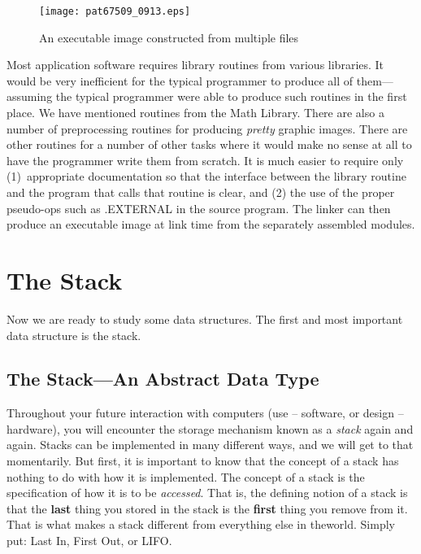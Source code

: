 \documentclass{patt}
\begin{document}
\begin{figure}[h!]
\begin{minipage}{36pc}
\centerline{\texttt{[image: pat67509\_0913.eps]}}
\caption{An executable image constructed from multiple files}
\label{fig:exec_image}
\end{minipage}
\end{figure}

Most application software requires library routines from various
libraries.  It would be very inefficient for the typical programmer to
produce all of them---assuming the typical programmer were able to produce
such routines in the first place.  We have mentioned routines from the
Math Library.  There are also a number of preprocessing routines for
producing {\em pretty} graphic images.  There are other routines for a
number of other tasks where it would make no sense at all to have the
programmer write them from scratch.  It is much easier to require only
(1)~appropriate documentation so that the interface between the
library routine and the program that calls that routine is clear, and
(2) the use of the proper pseudo-ops such as .EXTERNAL in the source
program.  The linker can then produce an executable image at link time
from the separately assembled modules.

\FloatBarrier
\section{The Stack}

Now we are ready to study some data structures.  The first and most 
important data structure is the stack.

\subsection{The Stack---An Abstract Data Type}

Throughout your future interaction with computers (use -- software, or 
design -- hardware), you will encounter 
the storage mechanism known as a {\em stack} again and again.  Stacks can be
implemented in  many different ways, and we will get to
that momentarily.  But first, it is important to know that the concept
of a stack has nothing to do with how it is implemented. The concept
of a stack is the specification of how it is to be {\em accessed}.
That is, the defining notion of a stack is that the {\bf last}
thing you stored in the stack is the {\bf first} thing you remove from it.
That is what makes a stack different from everything else in
the\lightbulb[-20pt] world. Simply put: Last In, First Out, or LIFO.
 
\end{document}
